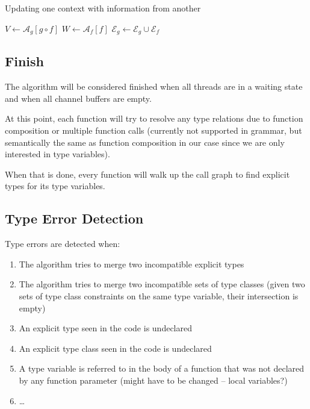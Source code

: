 \documentclass[10pt]{article}
\begin{document}
\begin{algorithm}
	\caption{Updating one context with information from another}
	\begin{algorithmic}[1]
		\Statex
		 
		\State $V \gets \mathcal{A}_g[g \circ f]$ 
		\State $W \gets \mathcal{A}_f[f]$
				\State {}
		\EndFor
		\EndIf
		\State	
		\State {}
			\State {}
			\EndIf
		\EndFor
		\State $\mathcal{E}_g \gets \mathcal{E}_g \cup \mathcal{E}_f$
		\EndFunction
	\end{algorithmic}
\end{algorithm}

\subsection{Finish}

The algorithm will be considered finished when all threads are in a waiting
state and when all channel buffers are empty.

At this point, each function will try to resolve any type relations due to
function composition or multiple function calls (currently not supported in
grammar, but semantically the same as function composition in our case since we
are only interested in type variables).

When that is done, every function will walk up the call graph to find explicit
types for its type variables.

\subsection{Type Error Detection}

Type errors are detected when:
\begin{enumerate}
	\item The algorithm tries to merge two incompatible explicit types
	\item The algorithm tries to merge two incompatible sets of type classes
		(given two sets of type class constraints on the same type variable,
		their intersection is empty) 
	\item An explicit type seen in the code is undeclared
	\item An explicit type class seen in the code is undeclared
	\item A type variable is referred to in the body of a function that was not
		declared by any function parameter (might have to be changed -- local
		variables?)
	\item \ldots
\end{enumerate}
\end{document}
